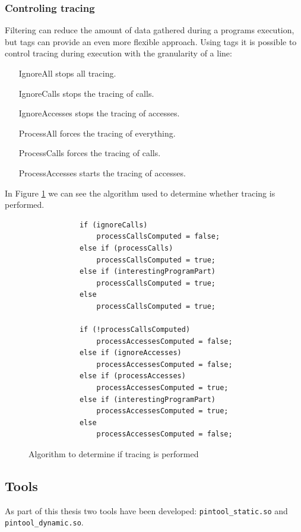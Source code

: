 \subsubsection{Controling tracing}
Filtering can reduce the amount of data gathered during a programs execution, but tags can provide an even more flexible approach. Using tags it is possible to control tracing during execution with the granularity of a line:

\begin{itemize}
	\item [IgnoreAll] stops all tracing.
	\item [IgnoreCalls] stops the tracing of calls.
	\item [IgnoreAccesses] stops the tracing of accesses.
	\item [ProcessAll] forces the tracing of everything.
	\item [ProcessCalls] forces the tracing of calls.
	\item [ProcessAccesses] starts the tracing of accesses.
\end{itemize}

In Figure \ref{cap3:contralg} we can see the algorithm used to determine whether tracing is performed.

\begin{figure}
	\begin{center}
		\begin{verbatim}
			if (ignoreCalls)
				processCallsComputed = false;
			else if (processCalls)
				processCallsComputed = true;
			else if (interestingProgramPart)
				processCallsComputed = true;
			else
				processCallsComputed = true;
			
			if (!processCallsComputed)
				processAccessesComputed = false;
			else if (ignoreAccesses)
				processAccessesComputed = false;
			else if (processAccesses)
				processAccessesComputed = true;
			else if (interestingProgramPart)
				processAccessesComputed = true;
			else
				processAccessesComputed = false;
		\end{verbatim}
	\end{center}
	\caption{Algorithm to determine if tracing is performed}
	\label{cap3:contralg}
\end{figure}

\subsection{Tools}

As part of this thesis two tools have been developed: \texttt{pintool\_static.so} and \texttt{pintool\_dynamic.so}.

